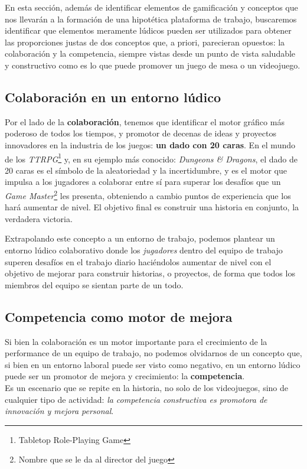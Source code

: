 \documentclass[journal]{IEEEtran}
\begin{document}
En esta sección, además de identificar elementos de gamificación y conceptos que nos llevarán a la formación de una hipotética plataforma de trabajo, buscaremos identificar que elementos meramente lúdicos pueden ser utilizados para obtener las proporciones justas de dos conceptos que, a priori, parecieran opuestos: la colaboración y la competencia, siempre vistas desde un punto de vista saludable y constructivo como es lo que puede promover un juego de mesa o un videojuego.

\subsection{\textbf{Colaboración en un entorno lúdico}}
Por el lado de la \textbf{colaboración}, tenemos que identificar el motor gráfico más poderoso de todos los tiempos, y promotor de decenas de ideas y proyectos innovadores en la industria de los juegos: \textbf{un dado con 20 caras}. En el mundo de los \textit{TTRPG}\footnote{Tabletop Role-Playing Game} y, en su ejemplo más conocido: \textit{Dungeons \& Dragons}, el dado de 20 caras es el símbolo de la aleatoriedad y la incertidumbre, y es el motor que impulsa a los jugadores a colaborar entre sí para superar los desafíos que un \textit{Game Master}\footnote{Nombre que se le da al director del juego} les presenta, obteniendo a cambio puntos de experiencia que los hará aumentar de nivel. El objetivo final es construir una historia en conjunto, la verdadera victoria.

Extrapolando este concepto a un entorno de trabajo, podemos plantear un entorno lúdico colaborativo donde los \textit{jugadores} dentro del equipo de trabajo superen desafíos en el trabajo diario haciéndolos aumentar de nivel con el objetivo de mejorar para construir historias, o proyectos, de forma que todos los miembros del equipo se sientan parte de un todo.

\subsection{\textbf{Competencia como motor de mejora}}
Si bien la colaboración es un motor importante para el crecimiento de la performance de un equipo de trabajo, no podemos olvidarnos de un concepto que, si bien en un entorno laboral puede ser visto como negativo, en un entorno lúdico puede ser un promotor de mejora y crecimiento: la \textbf{competencia}.
\\Es un escenario que se repite en la historia, no solo de los videojuegos, sino de cualquier tipo de actividad: \textit{la competencia constructiva es promotora de innovación y mejora personal}.
\end{document}
